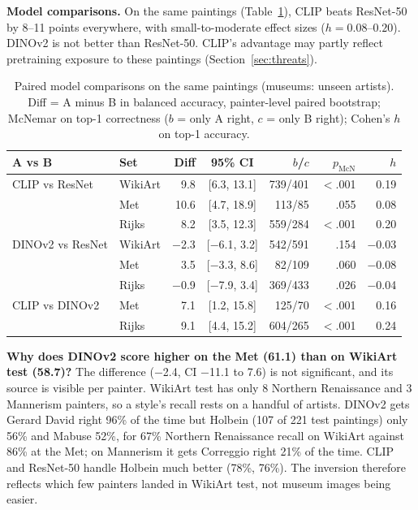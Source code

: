 \documentclass[conference]{IEEEtran}
\begin{document}
\textbf{Model comparisons.} On the same paintings (Table~\ref{tab:paired}), CLIP beats ResNet-50 by 8--11 points everywhere, with small-to-moderate effect sizes ($h = 0.08$--$0.20$). DINOv2 is not better than ResNet-50. CLIP's advantage may partly reflect pretraining exposure to these paintings (Section~\ref{sec:threats}).

\begin{table}[t]
\centering
\caption{Paired model comparisons on the same paintings (museums: unseen artists). Diff = A minus B in balanced accuracy, painter-level paired bootstrap; McNemar on top-1 correctness ($b$ = only A right, $c$ = only B right); Cohen's $h$ on top-1 accuracy.}
\label{tab:paired}
\setlength{\tabcolsep}{3pt}
\begin{tabular}{llrcrrr}
\toprule
A vs B & Set & Diff & 95\% CI & $b$/$c$ & $p_{\text{McN}}$ & $h$ \\
\midrule
CLIP vs ResNet & WikiArt & 9.8 & [6.3, 13.1] & 739/401 & $<$.001 & 0.19 \\
 & Met & 10.6 & [4.7, 18.9] & 113/85 & .055 & 0.08 \\
 & Rijks & 8.2 & [3.5, 12.3] & 559/284 & $<$.001 & 0.20 \\
DINOv2 vs ResNet & WikiArt & $-$2.3 & [$-$6.1, 3.2] & 542/591 & .154 & $-$0.03 \\
 & Met & 3.5 & [$-$3.3, 8.6] & 82/109 & .060 & $-$0.08 \\
 & Rijks & $-$0.9 & [$-$7.9, 3.4] & 369/433 & .026 & $-$0.04 \\
CLIP vs DINOv2 & Met & 7.1 & [1.2, 15.8] & 125/70 & $<$.001 & 0.16 \\
 & Rijks & 9.1 & [4.4, 15.2] & 604/265 & $<$.001 & 0.24 \\
\bottomrule
\end{tabular}
\end{table}

\textbf{Why does DINOv2 score higher on the Met (61.1) than on WikiArt test (58.7)?} The difference ($-$2.4, CI $-$11.1 to 7.6) is not significant, and its source is visible per painter. WikiArt test has only 8 Northern Renaissance and 3 Mannerism painters, so a style's recall rests on a handful of artists. DINOv2 gets Gerard David right 96\% of the time but Holbein (107 of 221 test paintings) only 56\% and Mabuse 52\%, for 67\% Northern Renaissance recall on WikiArt against 86\% at the Met; on Mannerism it gets Correggio right 21\% of the time. CLIP and ResNet-50 handle Holbein much better (78\%, 76\%). The inversion therefore reflects which few painters landed in WikiArt test, not museum images being easier.
\end{document}
